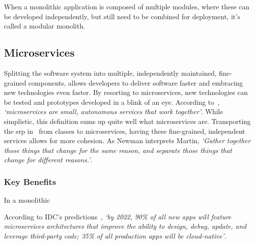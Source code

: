 

When a monolithic application is composed of multiple modules, where these can be developed independently, but still need to be combined for deployment, it's called a modular monolith. 








\subsection{Microservices}\label{state-of-the-art:ss:microservices}

Splitting the software system into multiple, independently maintained, fine-grained components, allows developers to deliver software faster and embracing new technologies even faster. By resorting to microservices, new technologies can be tested and prototypes developed in a blink of an eye.
According to~\Parencite{newman_2015}, \textit{`microservices are small, autonomous services that work together'}. While simplistic, this definition sums up quite well what microservices are. Transporting the \gls{srp} in~\Parencite{martin_2014} from classes to microservices, having these fine-grained, independent services allows for more cohesion. As Newman interprets Martin, \textit{`Gather together those things that change for the
same reason, and separate those things that change for different reasons.'}.

\subsubsection{Key Benefits}\label{state-of-the-art:sss:key-benefits}

In a monolithic






According to IDC's predictions~\Parencite{idc_2019}, \textit{`by 2022, 90\% of all new apps will feature microservices architectures that improve the ability to design, debug, update, and leverage third-party code; 35\% of all production apps will be cloud-native'}.















